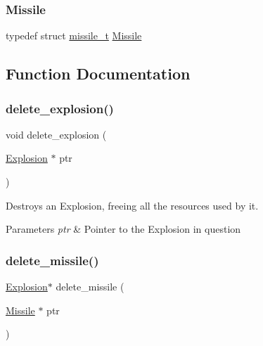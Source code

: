 \hypertarget{group___missile_ga7ea98f7c879356e5dfa41934529d86e1}{}\label{group___missile_ga7ea98f7c879356e5dfa41934529d86e1} 
\subsubsection{\texorpdfstring{Missile}{Missile}}
{\footnotesize\ttfamily typedef struct \hyperlink{structmissile__t}{missile\+\_\+t} \hyperlink{group___missile_ga7ea98f7c879356e5dfa41934529d86e1}{Missile}}



\subsection{Function Documentation}
\hypertarget{group___missile_ga41c05f1f6d72a4c84b12d595b9ae8cbc}{}\label{group___missile_ga41c05f1f6d72a4c84b12d595b9ae8cbc} 
\subsubsection{\texorpdfstring{delete\+\_\+explosion()}{delete\_explosion()}}
{\footnotesize\ttfamily void delete\+\_\+explosion (\begin{DoxyParamCaption}\item[{\hyperlink{group___missile_gab15157e0eccd9297f66644015d4966b1}{Explosion} $\ast$}]{ptr }\end{DoxyParamCaption})}



Destroys an Explosion, freeing all the resources used by it. 


\begin{DoxyParams}{Parameters}
{\em ptr} & Pointer to the Explosion in question \\
\hline
\end{DoxyParams}
\hypertarget{group___missile_ga693cd51b6557695cb6593b56fbc89df8}{}\label{group___missile_ga693cd51b6557695cb6593b56fbc89df8} 
\subsubsection{\texorpdfstring{delete\+\_\+missile()}{delete\_missile()}}
{\footnotesize\ttfamily \hyperlink{group___missile_gab15157e0eccd9297f66644015d4966b1}{Explosion}$\ast$ delete\+\_\+missile (\begin{DoxyParamCaption}\item[{\hyperlink{group___missile_ga7ea98f7c879356e5dfa41934529d86e1}{Missile} $\ast$}]{ptr }\end{DoxyParamCaption})}



